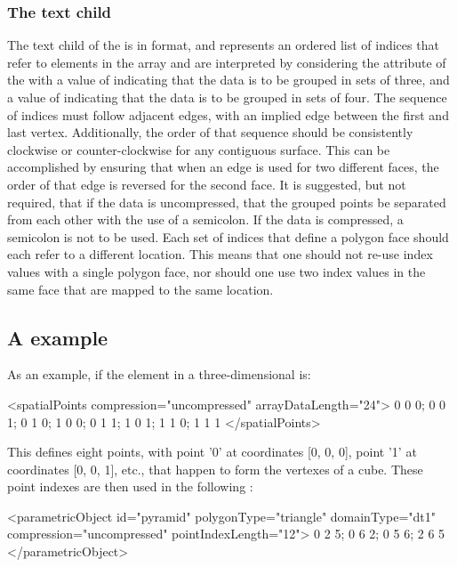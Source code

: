 \subsubsection{The \fixttspace{} text child}
The  text child of the \ParametricObject is in  format, and represents an ordered list of indices that refer to elements in the \SpatialPoints array and are interpreted by considering the  attribute of the \ParametricObject with a value of  indicating that the data is to be grouped in sets of three, and a value of  indicating that the data is to be grouped in sets of four.  The sequence of indices must follow adjacent edges, with an implied edge between the first and last vertex.  Additionally, the order of that sequence should be consistently clockwise or counter-clockwise for any contiguous surface.  This can be accomplished by ensuring that when an edge is used for two different faces, the order of that edge is reversed for the second face.  It is suggested, but not required, that if the data is uncompressed, that the grouped points be separated from each other with the use of a semicolon.  If the data is compressed, a semicolon is not to be used.  Each set of indices that define a polygon face should each refer to a different location.  This means that one should not re-use index values with a single polygon face, nor should one use two index values in the same face that are mapped to the same location.

\subsection{A  example}
\label{parametricgeometry-example}

As an example, if the \SpatialPoints element in a three-dimensional \Geometry is:

\begin{example}
    <spatialPoints compression="uncompressed" arrayDataLength="24">
        0 0 0; 0 0 1; 0 1 0; 1 0 0; 0 1 1; 1 0 1; 1 1 0; 1 1 1
    </spatialPoints>
\end{example}

This defines eight points, with point '0' at coordinates [0, 0, 0], point '1' at coordinates [0, 0, 1], etc., that happen to form the vertexes of a cube.  These point indexes are then used in the following \ParametricObject:

\begin{example}
    <parametricObject id="pyramid" polygonType="triangle" domainType="dt1"
                      compression="uncompressed" pointIndexLength="12">
        0 2 5; 0 6 2; 0 5 6; 2 6 5
    </parametricObject>
\end{example}

